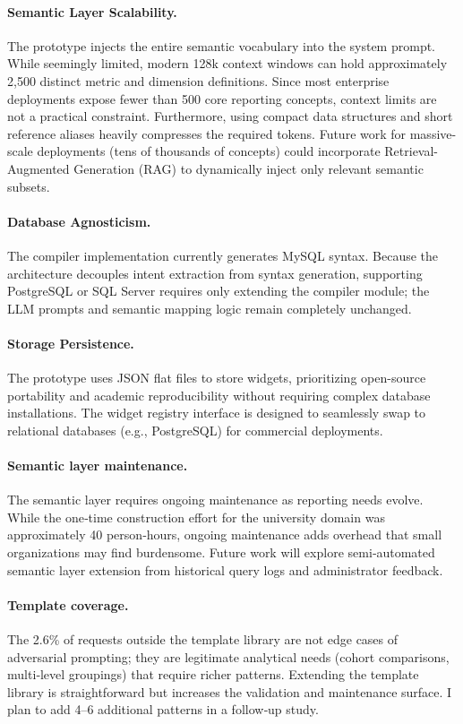 \documentclass[11pt]{article}
\begin{document}
\paragraph{Semantic Layer Scalability.} The prototype injects the entire semantic vocabulary into the system prompt. While seemingly limited, modern 128k context windows can hold approximately 2,500 distinct metric and dimension definitions. Since most enterprise deployments expose fewer than 500 core reporting concepts, context limits are not a practical constraint. Furthermore, using compact data structures and short reference aliases heavily compresses the required tokens. Future work for massive-scale deployments (tens of thousands of concepts) could incorporate Retrieval-Augmented Generation (RAG) to dynamically inject only relevant semantic subsets.

\paragraph{Database Agnosticism.} The compiler implementation currently generates MySQL syntax. Because the architecture decouples intent extraction from syntax generation, supporting PostgreSQL or SQL Server requires only extending the compiler module; the LLM prompts and semantic mapping logic remain completely unchanged.

\paragraph{Storage Persistence.} The prototype uses JSON flat files to store widgets, prioritizing open-source portability and academic reproducibility without requiring complex database installations. The widget registry interface is designed to seamlessly swap to relational databases (e.g., PostgreSQL) for commercial deployments.

\paragraph{Semantic layer maintenance.} The semantic layer requires ongoing maintenance as reporting needs evolve. While the one‑time construction effort for the university domain was approximately 40 person‑hours, ongoing maintenance adds overhead that small organizations may find burdensome. Future work will explore semi‑automated semantic layer extension from historical query logs and administrator feedback.

\paragraph{Template coverage.} The 2.6\% of requests outside the template library are not edge cases of adversarial prompting; they are legitimate analytical needs (cohort comparisons, multi‑level groupings) that require richer patterns. Extending the template library is straightforward but increases the validation and maintenance surface. I plan to add 4–6 additional patterns in a follow‑up study.
\end{document}
